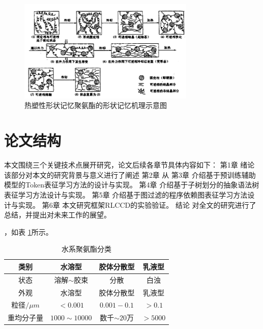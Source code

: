 \begin{figure}
 \centering
 \includegraphics[width=0.75\textwidth]{figures/figure1}
 \caption{热塑性形状记忆聚氨酯的形状记忆机理示意图}\label{fig:diagram}
\end{figure}


\section{论文结构}
本文围绕三个关键技术点展开研究，论文后续各章节具体内容如下：
第1章 绪论 该部分对本文的研究背景与意义进行了阐述 
第2章 从
第3章 介绍基于预训练辅助模型的Token表征学习方法的设计与实现。
第4章 介绍基于子树划分的抽象语法树表征学习方法设计与实现。
第5章 介绍基于图过滤的程序依赖图表征学习方法设计与实现。
第6章 本文研究框架RLCCD的实验验证。
结论 对全文的研究进行了总结，并提出对未来工作的展望。

\cite{Jiang2005Size} ，如表 \ref{tab:category}所示。

\begin{table}
  \centering
  \caption{水系聚氨酯分类} \label{tab:category}
  \begin{tabular*}{0.9\textwidth}{@{\extracolsep{\fill}}cccc}
  \toprule
    类别			&水溶型		&胶体分散型		&乳液型 \\
  \midrule
    状态			&溶解$\sim$胶束	&分散		&白浊 \\
    外观			&水溶型		&胶体分散型		&乳液型 \\
    粒径$/\mu m$	&$<0.001$		&$0.001-0.1$		&$>0.1$ \\
    重均分子量	&$1000\sim 10000$	&数千$\sim 20万$ &$>5000$ \\
  \bottomrule
  \end{tabular*}
\end{table}


